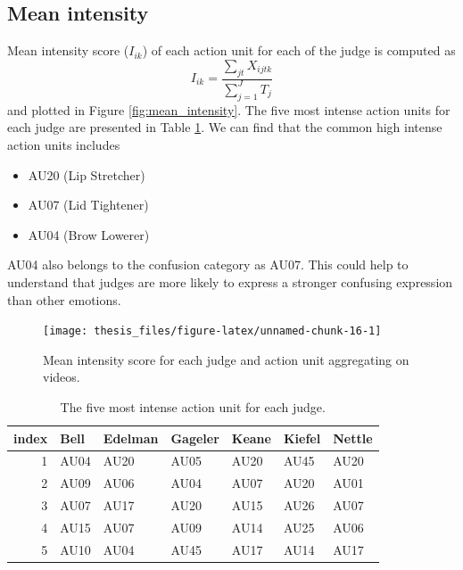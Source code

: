 \documentclass{monashthesis}
\begin{document}
\hypertarget{mean-intensity}{%
\subsection{Mean intensity}\label{mean-intensity}}

Mean intensity score (\(I_{ik}\)) of each action unit for each of the judge is computed as \[I_{ik} = \frac{\sum_{jt}X_{ijtk}}{\sum_{j = 1}^JT_j}\] and plotted in Figure \ref{fig:mean_intensity}. The five most intense action units for each judge are presented in Table \ref{tab:most_intense}. We can find that the common high intense action units includes

\begin{itemize}
\tightlist
\item
  AU20 (Lip Stretcher)
\item
  AU07 (Lid Tightener)
\item
  AU04 (Brow Lowerer)
\end{itemize}

AU04 also belongs to the confusion category as AU07. This could help to understand that judges are more likely to express a stronger confusing expression than other emotions.

\begin{figure}
\texttt{[image: thesis\_files/figure-latex/unnamed-chunk-16-1]} \caption{Mean intensity score for each judge and action unit aggregating on videos.\label{fig:mean_intensity}}\label{fig:unnamed-chunk-16}
\end{figure}

\begin{table}[t]

\caption{\label{tab:unnamed-chunk-17}\label{tab:most_intense}The five most intense action unit for each judge.}
\centering
\begin{tabular}{r|l|l|l|l|l|l}
\hline
index & Bell & Edelman & Gageler & Keane & Kiefel & Nettle\\
\hline
1 & AU04 & AU20 & AU05 & AU20 & AU45 & AU20\\
\hline
2 & AU09 & AU06 & AU04 & AU07 & AU20 & AU01\\
\hline
3 & AU07 & AU17 & AU20 & AU15 & AU26 & AU07\\
\hline
4 & AU15 & AU07 & AU09 & AU14 & AU25 & AU06\\
\hline
5 & AU10 & AU04 & AU45 & AU17 & AU14 & AU17\\
\hline
\end{tabular}
\end{table}
\end{document}

